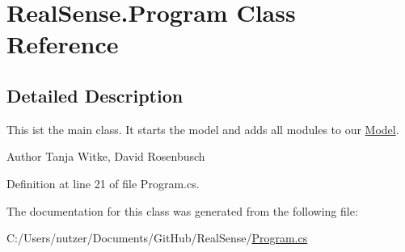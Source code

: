 \hypertarget{class_real_sense_1_1_program}{}\section{Real\+Sense.\+Program Class Reference}
\label{class_real_sense_1_1_program}


\subsection{Detailed Description}
This ist the main class. It starts the model and adds all modules to our \hyperlink{class_real_sense_1_1_model}{Model}.

\begin{DoxyAuthor}{Author}
Tanja Witke, David Rosenbusch 
\end{DoxyAuthor}


Definition at line 21 of file Program.\+cs.



The documentation for this class was generated from the following file\+:\begin{DoxyCompactItemize}
\item 
C\+:/\+Users/nutzer/\+Documents/\+Git\+Hub/\+Real\+Sense/\hyperlink{_program_8cs}{Program.\+cs}\end{DoxyCompactItemize}
